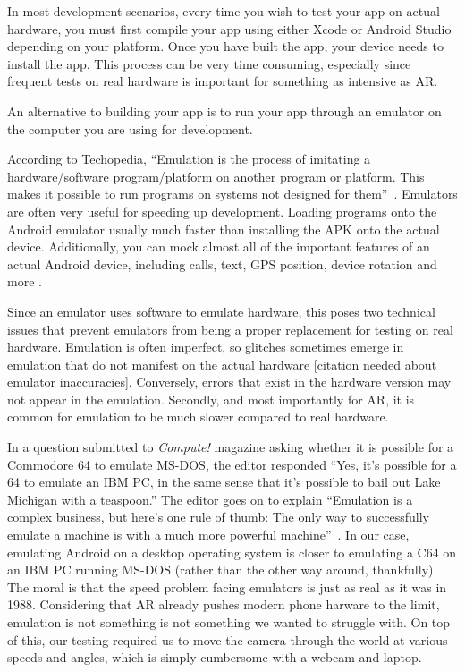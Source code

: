 \documentclass[a4paper, 10pt, american, titlepage]{article}
\begin{document}
In most development scenarios, every time you wish to test your app on actual
hardware, you must first compile your app using either Xcode or Android Studio
depending on your platform. Once you have built the app, your device needs to
install the app. This process can be very time consuming, especially since
frequent tests on real hardware is important for something as intensive as
AR.

An alternative to building your app is to run your app through an emulator on
the computer you are using for development.

According to Techopedia, ``Emulation is the process of imitating a
hardware/software program/platform on another program or platform. This makes
it possible to run programs on systems not designed for
them''~\autocite{techopedia2019}. Emulators are often very useful for speeding
up development. Loading programs onto the Android emulator usually much faster
than installing the APK onto the actual device. Additionally, you can mock
almost all of the important features of an actual Android device, including
calls, text, GPS position, device rotation and more \autocite{androidemulator}.

Since an emulator uses software to emulate hardware, this poses two technical
issues that prevent emulators from being a proper replacement for testing on
real hardware.  Emulation is often imperfect, so glitches sometimes emerge in
emulation that do not manifest on the actual hardware [citation needed about
emulator inaccuracies]. Conversely, errors that exist in the hardware version
may not appear in the emulation. Secondly, and most importantly for AR, it is
common for emulation to be much slower compared to real hardware.

In a question submitted to \textit{Compute!} magazine asking whether it is
possible for a Commodore 64 to emulate MS-DOS, the editor responded ``Yes, it's
possible for a 64 to emulate an IBM PC, in the same sense that it's possible to
bail out Lake Michigan with a teaspoon.'' The editor goes on to explain
``Emulation is a complex business, but here's one rule of thumb: The only way to
successfully emulate a machine is with a much more powerful
machine''~\autocite{warick1988}. In our case, emulating Android on a desktop
operating system is closer to emulating a C64 on an IBM PC running MS-DOS
(rather than the other way around, thankfully). The moral is that the speed
problem facing emulators is just as real as it was in 1988. Considering that AR
already pushes modern phone harware to the limit, emulation is not something is
not something we wanted to struggle with. On top of this, our testing required
us to move the camera through the world at various speeds and angles, which is
simply cumbersome with a webcam and laptop.
\end{document}
